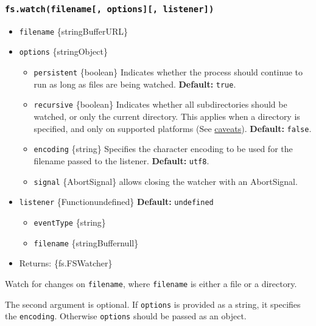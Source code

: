 \subsubsection{\texorpdfstring{\texttt{fs.watch(filename{[},\ options{]}{[},\ listener{]})}}{fs.watch(filename{[}, options{]}{[}, listener{]})}}\label{fs.watchfilename-options-listener}

\begin{itemize}
\tightlist
\item
  \texttt{filename} \{string\textbar Buffer\textbar URL\}
\item
  \texttt{options} \{string\textbar Object\}

  \begin{itemize}
  \tightlist
  \item
    \texttt{persistent} \{boolean\} Indicates whether the process should
    continue to run as long as files are being watched.
    \textbf{Default:} \texttt{true}.
  \item
    \texttt{recursive} \{boolean\} Indicates whether all subdirectories
    should be watched, or only the current directory. This applies when
    a directory is specified, and only on supported platforms (See
    \hyperref[caveats]{caveats}). \textbf{Default:} \texttt{false}.
  \item
    \texttt{encoding} \{string\} Specifies the character encoding to be
    used for the filename passed to the listener. \textbf{Default:}
    \texttt{\textquotesingle{}utf8\textquotesingle{}}.
  \item
    \texttt{signal} \{AbortSignal\} allows closing the watcher with an
    AbortSignal.
  \end{itemize}
\item
  \texttt{listener} \{Function\textbar undefined\} \textbf{Default:}
  \texttt{undefined}

  \begin{itemize}
  \tightlist
  \item
    \texttt{eventType} \{string\}
  \item
    \texttt{filename} \{string\textbar Buffer\textbar null\}
  \end{itemize}
\item
  Returns: \{fs.FSWatcher\}
\end{itemize}

Watch for changes on \texttt{filename}, where \texttt{filename} is
either a file or a directory.

The second argument is optional. If \texttt{options} is provided as a
string, it specifies the \texttt{encoding}. Otherwise \texttt{options}
should be passed as an object.

